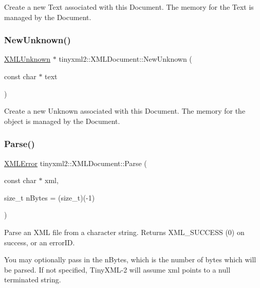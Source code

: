 Create a new Text associated with this Document. The memory for the Text is managed by the Document. \mbox{\label{classtinyxml2_1_1_x_m_l_document_a4954f502c5fd7f49de54c3c0c99bb73d}} 
\subsubsection{\texorpdfstring{New\+Unknown()}{NewUnknown()}}
{\footnotesize\ttfamily \hyperlink{classtinyxml2_1_1_x_m_l_unknown}{X\+M\+L\+Unknown} $\ast$ tinyxml2\+::\+X\+M\+L\+Document\+::\+New\+Unknown (\begin{DoxyParamCaption}\item[{const char $\ast$}]{text }\end{DoxyParamCaption})}

Create a new Unknown associated with this Document. The memory for the object is managed by the Document. \mbox{\label{classtinyxml2_1_1_x_m_l_document_a1819bd34f540a7304c105a6232d25a1f}} 
\subsubsection{\texorpdfstring{Parse()}{Parse()}}
{\footnotesize\ttfamily \hyperlink{namespacetinyxml2_a1fbf88509c3ac88c09117b1947414e08}{X\+M\+L\+Error} tinyxml2\+::\+X\+M\+L\+Document\+::\+Parse (\begin{DoxyParamCaption}\item[{const char $\ast$}]{xml,  }\item[{size\+\_\+t}]{n\+Bytes = {\ttfamily (size\+\_\+t)(-\/1)} }\end{DoxyParamCaption})}

Parse an X\+ML file from a character string. Returns X\+M\+L\+\_\+\+S\+U\+C\+C\+E\+SS (0) on success, or an error\+ID.

You may optionally pass in the \textquotesingle{}n\+Bytes\textquotesingle{}, which is the number of bytes which will be parsed. If not specified, Tiny\+X\+M\+L-\/2 will assume \textquotesingle{}xml\textquotesingle{} points to a null terminated string. \mbox{\label{classtinyxml2_1_1_x_m_l_document_a867cf5fa3e3ff6ae4847a8b7ee8ec083}} 
